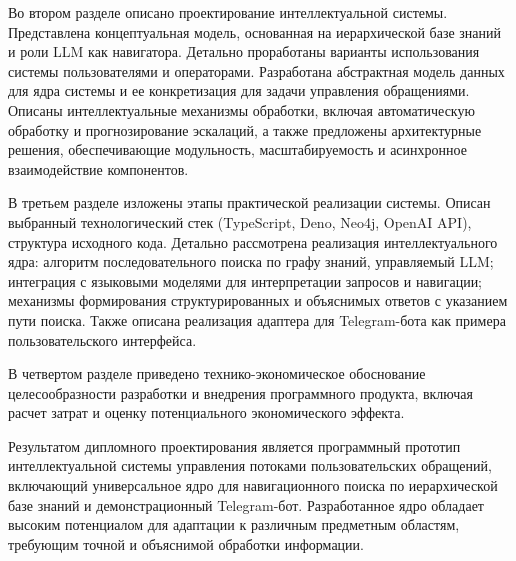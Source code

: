 Во втором разделе описано проектирование интеллектуальной системы. Представлена концептуальная модель, основанная на иерархической базе знаний и роли LLM как навигатора. Детально проработаны варианты использования системы пользователями и операторами. Разработана абстрактная модель данных для ядра системы и ее конкретизация для задачи управления обращениями. Описаны интеллектуальные механизмы обработки, включая автоматическую обработку и прогнозирование эскалаций, а также предложены архитектурные решения, обеспечивающие модульность, масштабируемость и асинхронное взаимодействие компонентов.

В третьем разделе изложены этапы практической реализации системы. Описан выбранный технологический стек (TypeScript, Deno, Neo4j, OpenAI API), структура исходного кода. Детально рассмотрена реализация интеллектуального ядра: алгоритм последовательного поиска по графу знаний, управляемый LLM; интеграция с языковыми моделями для интерпретации запросов и навигации; механизмы формирования структурированных и объяснимых ответов с указанием пути поиска. Также описана реализация адаптера для Telegram-бота как примера пользовательского интерфейса.

В четвертом разделе приведено технико-экономическое обоснование целесообразности разработки и внедрения программного продукта, включая расчет затрат и оценку потенциального экономического эффекта.

Результатом дипломного проектирования является программный прототип интеллектуальной системы управления потоками пользовательских обращений, включающий универсальное ядро для навигационного поиска по иерархической базе знаний и демонстрационный Telegram-бот. Разработанное ядро обладает высоким потенциалом для адаптации к различным предметным областям, требующим точной и объяснимой обработки информации.

\clearpage
